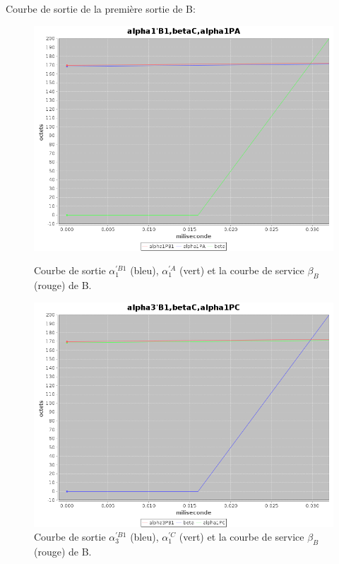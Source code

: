 Courbe de sortie de la première sortie de B: 
\begin{figure}[!ht]%
\begin{minipage}{.48\textwidth}%
\centering%
\noindent\includegraphics[width = \textwidth]{./II/images/alpha1PB1.png}%
\caption{\label{fig:alpha1PB1}Courbe de sortie $\alpha_{1}^{'B1}$ (bleu), $\alpha_{1} ^{'A}$ (vert) et la courbe de service $\beta_B$ (rouge) de B.}%
\end{minipage}\hfill%
\begin{minipage}{.48\textwidth}%
\centering%
\noindent\includegraphics[width = \textwidth]{./II/images/alpha3PB1.png}%
\caption{\label{fig:alpha3PB1}Courbe de sortie $\alpha_3 ^{'B1}$ (bleu), $\alpha_1^{'C}$ (vert) et la courbe de service $\beta_B$ (rouge) de B.}%

\end{minipage}
\end{figure}
